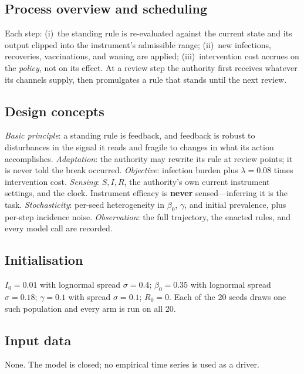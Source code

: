 \subsection*{Process overview and scheduling}
Each step: (i)~the standing rule is re-evaluated against the current state and its output clipped
into the instrument's admissible range; (ii)~new infections, recoveries, vaccinations, and waning
are applied; (iii)~intervention cost accrues on the \emph{policy}, not on its effect. At a review
step the authority first receives whatever its channels supply, then promulgates a rule that stands
until the next review.

\subsection*{Design concepts}
\emph{Basic principle}: a standing rule is feedback, and feedback is robust to disturbances in
the signal it reads and fragile to changes in what its action accomplishes.
\emph{Adaptation}: the authority may rewrite its rule at review points; it is never told the
break occurred. \emph{Objective}: infection burden plus $\lambda=0.08$ times
intervention cost. \emph{Sensing}: $S, I, R$, the authority's own current instrument settings, and
the clock. Instrument efficacy is \textbf{never} sensed---inferring it is the task.
\emph{Stochasticity}: per-seed heterogeneity in $\beta_0$, $\gamma$, and initial prevalence,
plus per-step incidence noise. \emph{Observation}: the full trajectory, the enacted rules, and
every model call are recorded.

\subsection*{Initialisation}
$I_0 = 0.01$ with lognormal spread $\sigma=0.4$;
$\beta_0 = 0.35$ with lognormal spread $\sigma=0.18$;
$\gamma = 0.1$ with spread $\sigma=0.1$; $R_0 = 0$. Each of the 20
seeds draws one such population and every arm is run on all 20.

\subsection*{Input data}
None. The model is closed; no empirical time series is used as a driver.

